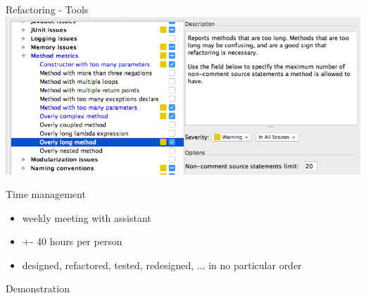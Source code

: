 \documentclass[10pt]{beamer}
\begin{document}
\begin{frame}[fragile]{Refactoring - Tools}
	\includegraphics[width=1\textwidth]{refactoring}
\end{frame}

\begin{frame}[fragile]{Time management}
\begin{itemize}
\item weekly meeting with assistant
\item +- 40 hours per person
\item designed, refactored, tested, redesigned, ... in no particular order
\end{itemize}
\end{frame}

{
\begin{frame}[standout]
  Demonstration
\end{frame}
}
\end{document}

